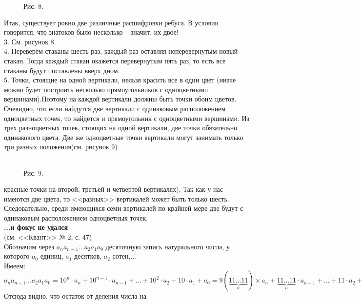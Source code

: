 \documentclass[2pt,twocolumn]{article}
\newcommand\tab[1][1cm]{\hspace*{#1}}
\begin{document}
\begin{flushleft}
\begin{figure}[h!]
        {\small Рис. 8.}
    \end{figure}
    \tab Итак, существует ровно две различные расшифровки ребуса. В условии говорится, что знатоков было несколько -- значит, их двое!\\
    \tab 3. См. рисунок 8.\\
    \tab 4. Переверём стаканы шесть раз, каждый раз оставляя неперевернутым новый стакан. Тогда каждый стакан окажется перевернутым пять раз, то есть все стаканы будут поставлены вверх дном.\\
    \tab 5. Точки, стоящие на одной вертикали, нельзя красить все в один цвет (иначе можно будет построить несколько прямоугольников с одноцветными вершинами).Поэтому на каждой вертикали должны быть точки обоим цветов. Очевидно, что если найдутся две вертикали с одинаковым расположением одноцветных точек, то найдется и прямоугольник с одноцветными вершинами. Из трех разноцветных точек, стоящих на одной вертикали, две точки обязательно одинакового цвета. Две же одноцветные точки вертикали могут занимать только три разных положения(см. рисунок 9)\\
    \begin{figure}[h!]
        \\
        {\small Рис. 9.}
        \label{fig:image}
    \end{figure}
    красные точки на второй, третьей и четвертой вертикалях). Так как у нас имеются две цвета, то <<разных>> вертикалей может быть только шесть. Следовательно, среди имеющихся семи вертикалей по крайней мере две будут с одинаковым расположением одноцветных точек.\\
    \textbf{...и фокус не удался}\\
    \tab(см. <<Квант>> № 2, с. 47)\\
    \tab Обозначим через $\overline{a_n a_{n-1}...a_2a_1a_0}$ десятичную запись натурального числа, у которого $a_0$ единиц, $a_1$ десятков, $a_2$ сотен,...\\
    \tab Имеем:\\
    \begingroup
    \fontsize{3pt}{7pt}\selectfont
    $\overline{a_na_{n-1}...a_2a_1a_0}=10^n\cdot a_n+10^{n-1}\cdot a_{n-1}+...+10^2 \cdot a_2+10\cdot a_1+a_0=9(\overline{\underbrace{11...11}_n})\times a_n+\overline{\underbrace{11...11}_n}\cdot a_{n-1}+...+11\cdot a_2+a_1)+(a_n+a_{n-1}+...+a_3+a_2+a_1+a_0)$\\
    \endgroup
    \tab Отсюда видно, что остаток от деления числа на
\end{flushleft}
\end{document}
